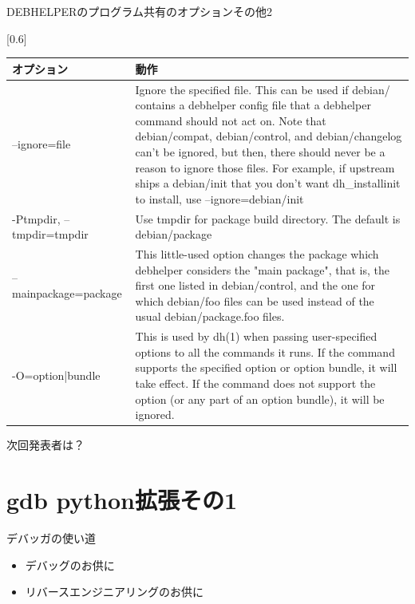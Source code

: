 \begin{frame}{DEBHELPERのプログラム共有のオプションその他2}
\begin{table}[htb]
\scalebox{0.6}[0.6]{
\begin{tabular}{|l|p{30em}|} \hline
オプション & 動作 \\ \hline
--ignore=file & Ignore the specified file. This can be used if debian/ contains a debhelper config file that a debhelper command should not act on. Note that debian/compat,
           debian/control, and debian/changelog can't be ignored, but then, there should never be a reason to ignore those files.
           For example, if upstream ships a debian/init that you don't want dh\_installinit to install, use --ignore=debian/init  \\ \hline
-Ptmpdir, --tmpdir=tmpdir & Use tmpdir for package build directory. The default is debian/package \\ \hline
--mainpackage=package & This little-used option changes the package which debhelper considers the "main package", that is, the first one listed in debian/control, and the one for which
           debian/foo files can be used instead of the usual debian/package.foo files. \\ \hline
-O=option|bundle & This is used by dh(1) when passing user-specified options to all the commands it runs. If the command supports the specified option or option bundle, it will
           take effect. If the command does not support the option (or any part of an option bundle), it will be ignored.\\ \hline
\end{tabular}
}
\end{table}
\end{frame}

\begin{frame}{次回発表者は？}

\Large


\end{frame}

\section{gdb python拡張その1}
\begin{frame}{デバッガの使い道}
\Large
\begin{itemize}
 \item デバッグのお供に
 \item リバースエンジニアリングのお供に
\end{itemize}
\end{frame}

